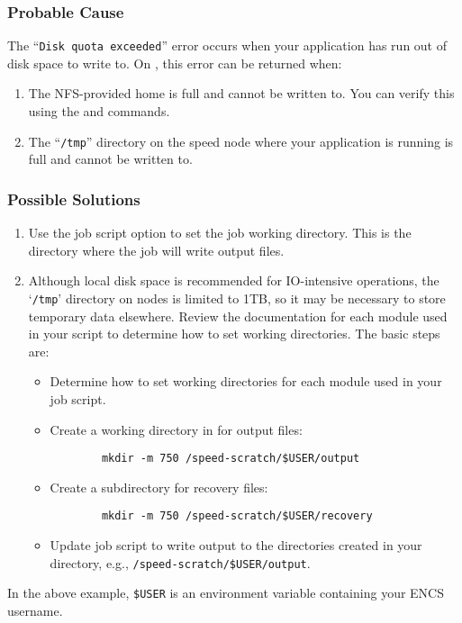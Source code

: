 \subsubsection{Probable Cause}
The ``\texttt{Disk quota exceeded}'' error occurs when your application has
run out of disk space to write to. On , this error can be returned when:
\begin{enumerate}
	\item The NFS-provided home is full and cannot be written to.
	You can verify this using the  and  commands.
	\item The ``\texttt{/tmp}'' directory on the speed node where your application is running is full and cannot be written to.
\end{enumerate}

\subsubsection{Possible Solutions}
\begin{enumerate}
	\item Use the  job script option to set the job working directory.
	This is the directory where the job will write output files.

 	\item Although local disk space is recommended for IO-intensive operations, the 
 	`\texttt{/tmp}' directory on  nodes is limited to 1TB, so it may be necessary 
	to store temporary data elsewhere. Review the documentation for each module
	used in your script to determine how to set working directories.
	The basic steps are:
	\begin{itemize}
	\item
	Determine how to set working directories for each module used in your job script.
	\item
	Create a working directory in  for output files:
	\begin{verbatim}
		mkdir -m 750 /speed-scratch/$USER/output
	\end{verbatim}
	\item
	Create a subdirectory for recovery files:
	\begin{verbatim}
		mkdir -m 750 /speed-scratch/$USER/recovery
	\end{verbatim}
	\item
	Update job script to write output to the directories created in your  directory,
	e.g., \verb!/speed-scratch/$USER/output!.
	\end{itemize}
\end{enumerate}
\noindent In the above example, \verb!$USER! is an environment variable containing your ENCS username.

